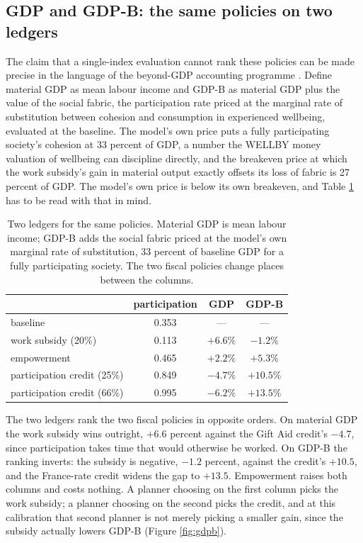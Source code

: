 \documentclass[11pt]{article}
\begin{document}
\subsection{GDP and GDP-B: the same policies on two ledgers}

The claim that a single-index evaluation cannot rank these policies can be made precise in the language of the beyond-GDP accounting programme \citep{brynjolfsson2019,stiglitz2009}. Define material GDP as mean labour income and GDP-B as material GDP plus the value of the social fabric, the participation rate priced at the marginal rate of substitution between cohesion and consumption in experienced wellbeing, evaluated at the baseline. The model's own price puts a fully participating society's cohesion at 33 percent of GDP, a number the WELLBY money valuation of wellbeing \citep{layard2023} can discipline directly, and the breakeven price at which the work subsidy's gain in material output exactly offsets its loss of fabric is 27 percent of GDP. The model's own price is below its own breakeven, and Table \ref{tab:gdpb} has to be read with that in mind.

\begin{table}[t]
\centering
\caption{Two ledgers for the same policies. Material GDP is mean labour income; GDP-B adds the social fabric priced at the model's own marginal rate of substitution, 33 percent of baseline GDP for a fully participating society. The two fiscal policies change places between the columns.}
\label{tab:gdpb}
\begin{tabular}{lccc}
\hline
 & participation & GDP & GDP-B \\
\hline
baseline & 0.353 & --- & --- \\
work subsidy (20\%) & 0.113 & $+6.6\%$ & $-1.2\%$ \\
empowerment & 0.465 & $+2.2\%$ & $+5.3\%$ \\
participation credit (25\%) & 0.849 & $-4.7\%$ & $+10.5\%$ \\
participation credit (66\%) & 0.995 & $-6.2\%$ & $+13.5\%$ \\
\hline
\end{tabular}
\end{table}

The two ledgers rank the two fiscal policies in opposite orders. On material GDP the work subsidy wins outright, $+6.6$ percent against the Gift Aid credit's $-4.7$, since participation takes time that would otherwise be worked. On GDP-B the ranking inverts: the subsidy is negative, $-1.2$ percent, against the credit's $+10.5$, and the France-rate credit widens the gap to $+13.5$. Empowerment raises both columns and costs nothing. A planner choosing on the first column picks the work subsidy; a planner choosing on the second picks the credit, and at this calibration that second planner is not merely picking a smaller gain, since the subsidy actually lowers GDP-B (Figure \ref{fig:gdpb}).
\end{document}
